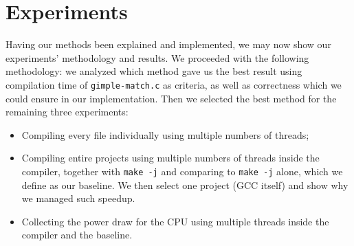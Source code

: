 %
%
%
%
%
%
%

\chapter{Experiments}\label{cap:experiments}

Having our methods been explained and implemented, we may now show our experiments'
methodology and results. We proceeded with the following methodology: we
analyzed which method gave us the best result using compilation time of
\texttt{gimple-match.c} as criteria, as well as correctness which we could
ensure in our implementation. Then we selected the best method for the
remaining three experiments:
\begin{itemize}
  \item Compiling every file individually using multiple numbers of threads;
  \item Compiling entire projects using multiple numbers of threads inside the
	compiler, together with \texttt{make -j} and comparing to \texttt{make -j} alone,
	which we define as our baseline. We then select one project (GCC itself) and
	show why we managed such speedup.
  \item Collecting the power draw for the CPU using multiple threads inside the
compiler and the baseline.
\end{itemize}


